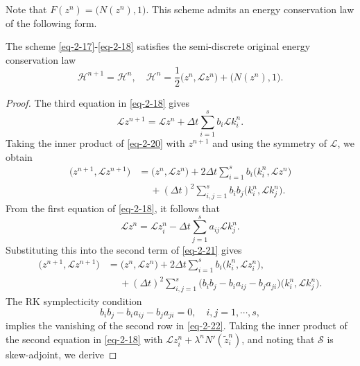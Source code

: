 \documentclass[onefignum,onetabnum]{siamart}
\begin{document}
\noindent Note that $F(z^n)=\big(N(z^n),1\big)$. This scheme admits an energy conservation law of the following form.
\begin{theorem}\label{Th-2-5}
The scheme \eqref{eq-2-17}-\eqref{eq-2-18} satisfies the semi-discrete original energy conservation law
\begin{equation}\label{eq-2-19}
	\mathcal{H}^{n+1}=\mathcal{H}^n,\quad  \mathcal{H}^n=\frac{1}{2}\big(z^n,\mathcal{L}z^n\big)+\big(N(z^n),1\big).
\end{equation} 
\end{theorem}
\begin{proof}
The third equation in \eqref{eq-2-18} gives
\begin{equation}\label{eq-2-20}
	\mathcal{L}z^{n+1}=\mathcal{L}z^n+\Delta t\sum_{i=1}^sb_i\mathcal{L}k_i^n.
\end{equation}
Taking the inner product of \eqref{eq-2-20} with $z^{n+1}$ and using the symmetry of $\mathcal{L}$, we obtain
\begin{equation}\label{eq-2-21}
	\begin{aligned}
		\big(z^{n+1},\mathcal{L}z^{n+1}\big)&=\big(z^n,\mathcal{L}z^n\big)+2\Delta t\sum_{i=1}^sb_i\big(k_i^n,\mathcal{L}z^n\big)\\
		&\quad~+(\Delta t)^2\sum_{i,j=1}^sb_ib_j\big(k_i^n,\mathcal{L}k_j^n\big).
	\end{aligned}
\end{equation}
From the first equation of \eqref{eq-2-18}, it follows that
\begin{equation*}
	\mathcal{L}z^n=\mathcal{L}z_i^n-\Delta t\sum_{j=1}^sa_{ij}\mathcal{L}k_j^n.	
\end{equation*}	
Substituting this into the second term of \eqref{eq-2-21} gives
\begin{equation}\label{eq-2-22}
	\begin{aligned}
		\big(z^{n+1},\mathcal{L}z^{n+1}\big)&=\big(z^n,\mathcal{L}z^n\big)+2\Delta t\sum_{i=1}^sb_i\big(k_i^n,\mathcal{L}z_i^n\big),\\
		&~\quad+(\Delta t)^2\sum_{i,j=1}^s\big(b_ib_j-b_ia_{ij}-b_ja_{ji}\big)\big(k_i^n,\mathcal{L}k_j^n\big).
	\end{aligned}
\end{equation}
The RK symplecticity condition \cite{hairer-06-GNI-ODE} 
\begin{equation}\label{eq-2-23}
	b_ib_j-b_ia_{ij}-b_ja_{ji}=0,\quad i,j=1,\cdots,s,
\end{equation}
implies the vanishing of the second row in \eqref{eq-2-22}. Taking the inner product of the second equation in \eqref{eq-2-18} with $\mathcal{L}z_i^n+\lambda^nN'(\tilde{z}_i^n)$, and noting that $\mathcal{S}$ is skew-adjoint, we derive

\end{proof}
\end{document}
